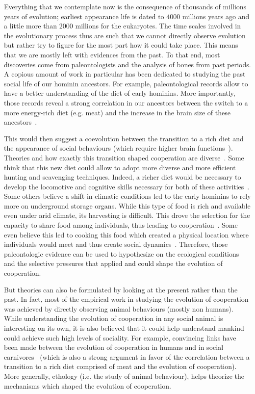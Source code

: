     Everything that we contemplate now is the consequence of thousands of millions years of evolution; earliest appearance life is dated to $4000$ millions years ago and a little more than $2000$ millions for the eukaryotes. The time scales involved in the evolutionary process thus are such that we cannot directly observe evolution but rather try to figure for the most part how it could take place. This means that we are mostly left with evidences from the past. To that end, most discoveries come from paleontologists and the analysis of bones from past periods. A copious amount of work in particular has been dedicated to studying the past social life of our hominin ancestors. For example, paleontological records allow to have a better understanding of the diet of early hominins. More importantly, those records reveal a strong correlation in our ancestors between the switch to a more energy-rich diet (e.g. meat) and the increase in the brain size of these ancestors~\parencite{Aiello1995, Wrangham1999}. 

    This would then suggest a coevolution between the transition to a rich diet and the appearance of social behaviours (which require higher brain functions~\parencite{Dunbar2007, Isler2012}). Theories and how exactly this transition shaped cooperation are diverse~\parencite{Pontzer2012}. Some think that this new diet could allow to adopt more diverse and more efficient hunting and scavenging techniques. Indeed, a richer diet would be necessary to develop the locomotive and cognitive skills necessary for both of these activities~\parencite{Aiello1995, Bramble2004}. Some others believe a shift in climatic conditions led to the early hominins to rely more on underground storage organs. While this type of food is rich and available even under arid climate, its harvesting is difficult. This drove the selection for the capacity to share food among individuals, thus leading to cooperation~\parencite{OConnell2002}. Some even believe this led to cooking this food which created a physical location where individuals would meet and thus create social dynamics~\parencite{Wrangham1999, Wrangham2009}. Therefore, those paleontologic evidence can be used to hypothesize on the ecological conditions and the selective pressures that applied and could shape the evolution of cooperation.

    But theories can also be formulated by looking at the present rather than the past. In fact, most of the empirical work in studying the evolution of cooperation was achieved by directly observing animal behaviours (mostly non humans). While understanding the evolution of cooperation in any social animal is interesting on its own, it is also believed that it could help understand mankind could achieve such high levels of sociality. For example, convincing links have been made between the evolution of cooperation in humans and in social carnivores~\parencite{Schaller1969, Smith2012a} (which is also a strong argument in favor of the correlation between a transition to a rich diet comprised of meat and the evolution of cooperation). More generally, ethology (i.e. the study of animal behaviour), helps theorize the mechanisms which shaped the evolution of cooperation.

